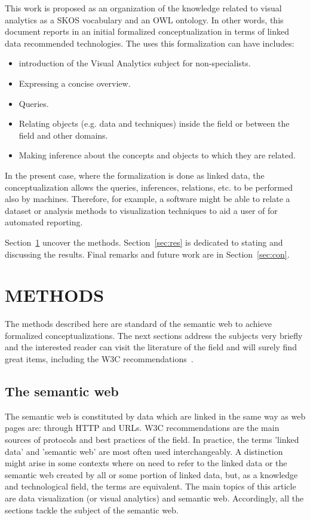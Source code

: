 \documentclass[12pt,fleqn]{article}
\begin{document}
This work is proposed as an organization of the knowledge related to visual analytics
as a SKOS vocabulary and an OWL ontology.
In other words, this document reports in an initial formalized conceptualization
in terms of linked data recommended technologies.
The uses this formalization can have includes:
\begin{itemize}
	\item introduction of the Visual Analytics subject for non-specialists.
	\item Expressing a concise overview.
	\item Queries.
	\item Relating objects (e.g. data and techniques) inside the field or between the field and other domains.
	\item Making inference about the concepts and objects to which they are related.
\end{itemize}

In the present case, where the formalization is done as linked data,
the conceptualization allows the queries, inferences, relations, etc.
to be performed also by machines.
Therefore, for example, a software might be able to relate a dataset
or analysis methods to visualization techniques to aid a user of
for automated reporting.

Section~\ref{sec:methods} uncover the methods.
Section~\ref{sec:res} is dedicated to stating and discussing the results.
Final remarks and future work are in Section~\ref{sec:con}.

\section{METHODS}\label{sec:methods}
The methods described here are standard of the semantic web
to achieve formalized conceptualizations.
The next sections address the subjects very briefly
and the interested reader can visit the literature
of the field and will surely find great items,
including the W3C recommendations~\citep{w3cld,ldb}.

\subsection{The semantic web}
The semantic web is constituted by data which are linked in the same way
as web pages are: through HTTP and URLs.
W3C recommendations are the main sources of protocols and best practices of the field.
In practice, the terms 'linked data' and 'semantic web' are most often used interchangeably.
A distinction might arise in some contexts where on need to refer to the linked data or
the semantic web created by all or some portion of linked data, but, as a knowledge and technological
field, the terms are equivalent.
The main topics of this article are data visualization (or visual analytics)
and semantic web.
Accordingly, all the sections tackle the subject of the semantic web.
\end{document}
